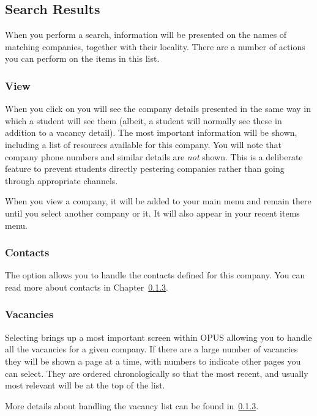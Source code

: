 \documentclass[12 pt]{book}
\begin{document}
\subsection{Search Results}

When you perform a search, information will be presented on the names of
matching companies, together with their locality. There are a number of 
actions you can perform on the items in this list.

\subsubsection{View}

When you click on  you will see the company details presented
in the same way in which a student will see them (albeit, a student will
normally see these in addition to a vacancy detail). The most important
information will be shown, including a list of resources available for this
company. You will note that company phone numbers and similar details are
\emph{not} shown. This is a deliberate feature to prevent students directly
pestering companies rather than going through appropriate channels.

When you view a company, it will be added to your main menu and remain there
until you select another company or  it. It will also appear
in your recent items menu.

\subsubsection{Contacts}

The  option allows you to handle the contacts defined for
this company. You can read more about contacts in Chapter~\ref{}.

\subsubsection{Vacancies}

Selecting  brings up a most important screen within OPUS
allowing you to handle all the vacancies for a given company. If there are
a large number of vacancies they will be shown a page at a time, with numbers
to indicate other pages you can select. They are ordered chronologically so
that the most recent, and usually most relevant will be at the top of the
list.

More details about handling the vacancy list can be found in~\ref{}.
\end{document}
